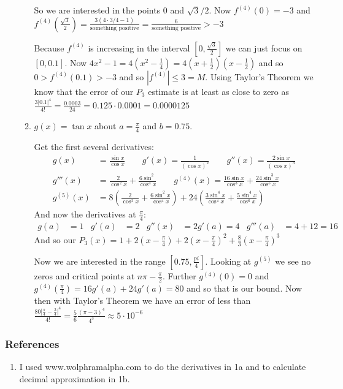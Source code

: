 \documentclass[letterpaper]{article}
\begin{document}
\begin{enumerate}
\begin{enumerate}
  So we are interested in the points 0 and $\sqrt{3}/2$.
  Now $f^{(4)}(0)=-3$ and $f^{(4)}(\frac{\sqrt{3}}{2})=\frac{3(4\cdot 3/4-1)}{\text{something positive}}=\frac{6}{\text{something positive}}>-3$


  Because $f^{(4)}$ is increasing in the interval $[0,\frac{\sqrt{3}}{2}]$ we can just focus on $[0,0.1]$. Now $4x^2-1=4(x^2-\frac{1}{4})=4(x+\frac{1}{2})(x-\frac{1}{2})$ and so $0>f^{(4)}(0.1)>-3$ and so $|f^{(4)}|\le 3=M$. Using Taylor's Theorem we know that the error of our $P_3$ estimate is at least as close to zero as $\frac{3|0.1|^4}{4!}=\frac{0.0003}{24}=0.125\cdot 0.0001=0.0000125$
  \item
  $g(x)=\tan x$ about $a=\frac{\pi}{4}$ and $b=0.75$.

  Get the first several derivatives:
  \begin{align*}
    g(x)&=\frac{\sin x}{\cos x}
    \quad\quad g'(x)=\frac{1}{(\cos x)^2}
    \quad\quad g''(x)=\frac{2\sin x}{(\cos x)^3}\\
    g'''(x)&=\frac{2}{\cos^2 x}+\frac{6\sin^2}{\cos^4 x}
    \quad\quad g^{(4)}(x)=\frac{16\sin x}{\cos^3 x}+\frac{24\sin^3 x}{\cos^5 x}\\
    g^{(5)}(x)&=8\left(\frac{2}{\cos^2 x}+\frac{6\sin^2 x}{\cos^4 x}\right)+24\left(\frac{3\sin^4 x}{\cos^4 x}+\frac{5\sin^4 x}{\cos^6 x}\right)
  \end{align*}
  And now the derivatives at $\frac{\pi}{4}$:
  \begin{align*}
    g(a)&=1&g'(a)&=2&g''(x)&=2g'(a)=4&g'''(a)&=4+12=16
  \end{align*}
  And so our $P_3(x)=1+2(x-\frac{\pi}{4})+2(x-\frac{\pi}{4})^2+\frac{8}{3}(x-\frac{\pi}{4})^3$

  Now we are interested in the range $[0.75,\frac{pi}{4}]$. Looking at $g^{(5)}$ we see no zeros and critical points at $n\pi-\frac{\pi}{2}$. Further $g^{(4)}(0)=0$ and $g^{(4)}(\frac{\pi}{4})=16g'(a)+24g'(a)=80$ and so that is our bound. Now then with Taylor's Theorem we have an error of less than $\frac{80|\frac{\pi}{4}-\frac{3}{4}|^4}{4!}=\frac{5}{6}\frac{(\pi-3)^4}{4^3}\approx5\cdot 10^{-6}$
  \end{enumerate}
\end{enumerate}
\subsubsection*{References}
\begin{enumerate}
\item
I used www.wolphramalpha.com to do the derivatives in 1a and to calculate decimal approximation in 1b.
\end{enumerate}
\end{document}
